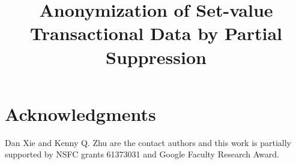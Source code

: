 \documentclass[10pt,doc,floatsintext,apacite]{apa6}
\title{Anonymization of Set-value Transactional Data by Partial Suppression}
\begin{document}
\maketitle








\section*{Acknowledgments}
Dan Xie and Kenny Q. Zhu are the contact authors
and this work is partially supported by NSFC grants 61373031 and
Google Faculty Research Award.

%
%

\end{document}
